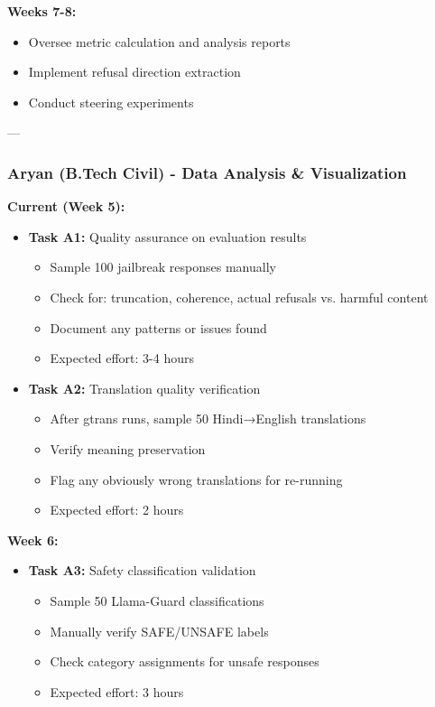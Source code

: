 \documentclass[11pt,a4paper]{article}
\begin{document}
\textbf{Weeks 7-8:}
\begin{itemize}
    \item Oversee metric calculation and analysis reports
    \item Implement refusal direction extraction
    \item Conduct steering experiments
\end{itemize}

---

\subsubsection{Aryan (B.Tech Civil) - Data Analysis \& Visualization}

\textbf{Current (Week 5):}
\begin{itemize}
    \item \textbf{Task A1:} Quality assurance on evaluation results
    \begin{itemize}
        \item Sample 100 jailbreak responses manually
        \item Check for: truncation, coherence, actual refusals vs. harmful content
        \item Document any patterns or issues found
        \item Expected effort: 3-4 hours
    \end{itemize}

    \item \textbf{Task A2:} Translation quality verification
    \begin{itemize}
        \item After gtrans runs, sample 50 Hindi→English translations
        \item Verify meaning preservation
        \item Flag any obviously wrong translations for re-running
        \item Expected effort: 2 hours
    \end{itemize}
\end{itemize}

\textbf{Week 6:}
\begin{itemize}
    \item \textbf{Task A3:} Safety classification validation
    \begin{itemize}
        \item Sample 50 Llama-Guard classifications
        \item Manually verify SAFE/UNSAFE labels
        \item Check category assignments for unsafe responses
        \item Expected effort: 3 hours
    \end{itemize}
\end{itemize}
\end{document}
